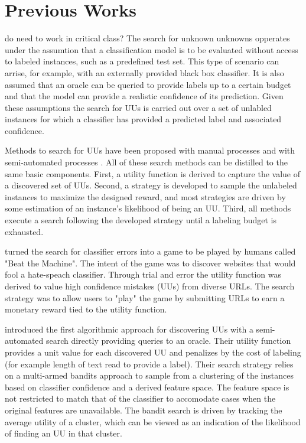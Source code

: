 \documentclass[letterpaper]{article} %
\newcommand{\wdb}[1]{{\color{blue} #1}} %
\begin{document}
\section{Previous Works}

\wdb{do need to work in critical class?}
The search for unknown unknowns opperates under the assumtion that a classification model is to be evaluated without access to labeled instances, such as a predefined test set. This type of scenario can arrise, for example, with an externally provided black box classifier.  It is also assumed that an oracle can be queried to provide labels up to a certain budget and that the model can provide a realistic confidence of its prediction.  Given these assumptions the search for UUs is carried out over a set of unlabled instances for which a classifier has provided a predicted label and associated confidence.  

Methods to search for UUs have been proposed with manual processes \citep{Attenberg2015} and with semi-automated processes \citep{Lakkaraju2016, Bansal2018}.  All of these search methods can be distilled to the same basic components.  First, a utility function is derived to capture the value of a discovered set of UUs. Second, a strategy is developed to sample the unlabeled instances to maximize the designed reward, and most strategies are driven by some estimation of an instance's likelihood of being an UU.  Third, all methods execute a search following the developed strategy until a labeling budget is exhausted.

\citet{Attenberg2015} turned the search for classifier errors into a game to be played by humans called "Beat the Machine". The intent of the game was to discover websites that would fool a hate-speach classifier. Through trial and error the utility function was derived to value high confidence mistakes (UUs) from diverse URLs. The search strategy was to allow users to "play" the game by submitting URLs to earn a monetary reward tied to the utility function.   

\citet{Lakkaraju2016} introduced the first algorithmic approach for discovering UUs with a semi-automated search directly providing queries to an oracle.  Their utility function provides a unit value for each discovered UU and penalizes by the cost of labeling (for example length of text read to provide a label). Their search strategy relies on a multi-armed bandits approach to sample from a clustering of the instances based on classifier confidence and a derived feature space.  The feature space is not restricted to match that of the classifier to accomodate cases when the original features are unavailable.  The bandit search is driven by tracking the average utility of a cluster, which can be viewed as an indication of the likelihood of finding an UU in that cluster. 
\end{document}
